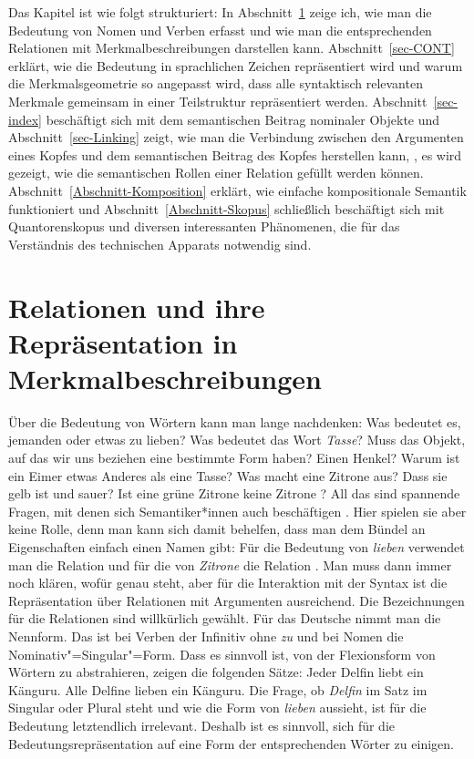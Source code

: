 Das Kapitel ist wie folgt strukturiert: In Abschnitt~\ref{sec-Relationen-und-Merkmalbeschreibungen}
zeige ich, wie man die Bedeutung von Nomen und Verben erfasst und wie man die entsprechenden
Relationen mit Merkmalbeschreibungen darstellen kann. Abschnitt~\ref{sec-CONT} erklärt, wie die
Bedeutung in sprachlichen Zeichen repräsentiert wird und warum die Merkmalsgeometrie so angepasst
wird, dass alle syntaktisch relevanten Merkmale gemeinsam in einer Teilstruktur repräsentiert
werden. Abschnitt~\ref{sec-index} beschäftigt sich mit dem semantischen Beitrag nominaler Objekte
und Abschnitt~\ref{sec-Linking}
zeigt, wie man die Verbindung zwischen den Argumenten eines Kopfes und dem semantischen Beitrag des
Kopfes herstellen kann, \dash, es wird gezeigt, wie die semantischen Rollen einer Relation gefüllt
werden können. Abschnitt~\ref{Abschnitt-Komposition} erklärt, wie einfache kompositionale Semantik
funktioniert und Abschnitt~\ref{Abschnitt-Skopus} schließlich beschäftigt sich mit Quantorenskopus und
diversen interessanten Phänomenen, die für das Verständnis des technischen Apparats notwendig sind.




\section{Relationen und ihre Repräsentation in Merkmalbeschreibungen}
\label{sec-Relationen-und-Merkmalbeschreibungen}

Über die Bedeutung von Wörtern kann man lange nachdenken: Was bedeutet es, jemanden oder etwas zu
lieben? Was bedeutet das Wort \emph{Tasse}? Muss das Objekt, auf das wir uns beziehen eine bestimmte
Form haben? Einen Henkel? Warum ist ein Eimer etwas Anderes als eine Tasse? Was macht eine Zitrone
aus? Dass sie gelb ist und sauer? Ist eine grüne Zitrone keine Zitrone \citep{Braisby90}? All das sind spannende
Fragen, mit denen sich Semantiker*innen auch beschäftigen \citep{Rosch1973b-u}. Hier spielen sie aber keine Rolle, denn
man kann sich damit behelfen, dass man dem Bündel an Eigenschaften einfach einen Namen gibt: Für die
Bedeutung von \emph{lieben} verwendet man die Relation  und für die von
\emph{Zitrone} die Relation . Man muss dann immer noch klären, wofür
 genau steht, aber für die Interaktion mit der Syntax ist die Repräsentation über
Relationen mit Argumenten ausreichend. Die Bezeichnungen für die Relationen sind willkürlich
gewählt. Für das Deutsche nimmt man die Nennform. Das ist bei Verben der Infinitiv ohne \emph{zu}
und bei Nomen die Nominativ"=Singular"=Form. Dass es sinnvoll ist, von der Flexionsform von Wörtern
zu abstrahieren, zeigen die folgenden Sätze: 
\eal
\label{ex-Alle-Delfine}
\ex Jeder Delfin liebt ein Känguru.
\ex Alle Delfine lieben ein Känguru.
\zl
Die Frage, ob \emph{Delfin} im Satz im Singular oder Plural steht und wie die Form von \emph{lieben}
aussieht, ist für die Bedeutung letztendlich irrelevant. Deshalb ist es sinnvoll, sich für die
Bedeutungsrepräsentation auf eine Form der entsprechenden Wörter zu einigen.

